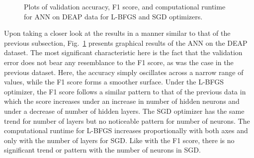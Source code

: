 \documentclass[12pt]{uthesis-v12}  %
\begin{document}
\begin{figure}
	\hfill	
{}
						
\caption{Plots of validation accuracy, F1 score, and computational runtime for ANN on DEAP data for L-BFGS and SGD optimizers.}
	\label{ann-deap}
	\end{figure}

Upon taking a closer look at the results in a manner similar to that of the previous subsection, Fig.~\ref{ann-deap} presents graphical results of the ANN on the DEAP dataset. The most significant characteristic here is the fact that the validation error does not bear any resemblance to the F1 score, as was the case in the previous dataset. Here, the accuracy simply oscillates across a narrow range of values, while the F1 score forms a smoother surface. Under the L-BFGS optimizer, the F1 score follows a similar pattern to that of the previous data in which the score increases under an increase in number of hidden neurons and under a decrease of number of hidden layers. The SGD optimizer has the same trend for number of layers but no noticeable pattern for number of neurons. The computational runtime for L-BFGS increases proportionally with both axes and only with the number of layers for SGD. Like with the F1 score, there is no significant trend or pattern with the number of neurons in SGD. 
\end{document}

